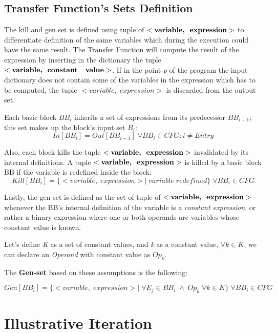 \documentclass[a4paper,12pt,numbers=noenddot]{scrreprt}
\begin{document}
    \subsection*{Transfer Function's Sets Definition}

        The kill and gen set is defined using tuple of $<\textbf{variable,\; expression}>$ to differentiate definition of the same variables which during the execution could have the same result. The Transfer Function will compute the result of the expression by inserting in the dictionary the tuple $<\textbf{variable,\; constant \; value}>$. If in the point \textit{p} of the program the input dictionary does not contain some of the variables in the expression which has to be computed, the tuple $<variable,\; expression>$ is discarded from the output set. 
        
        Each basic block $BB_i$ inherits a set of expressions from its predecessor $BB_{i-1}$; this set makes up the block's input set $B_i$: $$In[BB_i] = Out[BB_{i-1}] \; \forall BB_i \in CFG : i \neq Entry$$
        
        Also, each block kills the tuple $<\textbf{variable,\; expression}>$ invalidated by its internal definitions. A tuple $<\textbf{variable,\; expression}>$ is killed by a basic block BB if the variable is redefined inside the block: $$Kill[BB_i] = \{ <variable,\; expression> \vert \; variable \; redefined \} \; \forall BB_i \in CFG$$

        Lastly, the gen-set is defined as the set of tuple of $<\textbf{variable,\; expression}>$ whenever the BB's internal definition of the variable is a \textit{constant expression}, or rather a binary expression where one or both operands are variables whose constant value is known.

        Let's define \textit{K} as a set of constant values, and \textit{k} as a constant value, $\forall k \in K$, we can declare an \textit{Operand} with constant value as \textit{$Op_k$}.
        
        The \textbf{Gen-set} based on these assumptions is the following:
        
        $$Gen[BB_i] = \{ <variable,\; expression> \vert \; \forall E_j \in BB_i\; \wedge \; Op_k \; \forall k \in K \} \; \forall BB_i \in CFG$$
        
    \section*{Illustrative Iteration}
\end{document}
